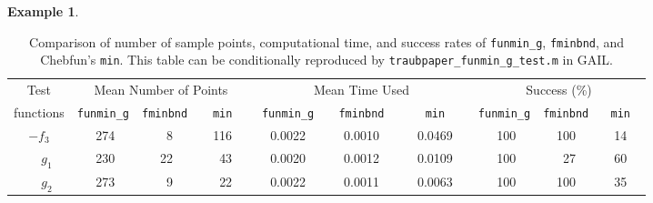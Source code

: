 \documentclass[review]{elsarticle}
\theoremstyle{definition}
\newtheorem{exmp}{Example}
\newcommand{\funming}{\texttt{funmin\_g}\xspace}
\newcommand{\fminbnd}{\texttt{fminbnd}\xspace}
\begin{document}
\begin{exmp}
%
\begin{table}[tb]
	\centering
	\caption{Comparison of number of sample points, computational time,  and success
		rates of \funming, \fminbnd, and
		Chebfun's \texttt{min}.
		This table can be conditionally reproduced by
		\texttt{traubpaper\_funmin\_g\_test.m} in GAIL.}
	\label{tab:funmingVsfminbndVsChebfun}
	{\footnotesize

	\setlength{\tabcolsep}{.3em}
		\begin{tabular}{ccrccrccrccrccrccrccrccrccrc}		
			Test      &    \multicolumn{9}{c}{Mean Number of Points}   & \multicolumn{9}{c}{Mean Time Used}  & \multicolumn{9}{c}{Success (\%)}
			\\  functions &  \multicolumn{3}{c}{\funming} &  \multicolumn{3}{c}{\fminbnd}  &  \multicolumn{3}{c}{\texttt{min}}
		  &  \multicolumn{3}{c}{\funming}  &  \multicolumn{3}{c}{\fminbnd }  &  \multicolumn{3}{c}{\texttt{min} }  &  \multicolumn{3}{c}{\funming} & \multicolumn{3}{c}{\fminbnd} & \multicolumn{3}{c}{\texttt{min}}
			\\ \toprule
			$-f_3$   &&  274   &&&   8   &&&  116     &&&   0.0022   &&&   0.0010    &&& 0.0469  &&&   100   &&&  100   &&&  14
			\\ $\phantom{-}g_1$   && 230 &&&  22   &&&    43    &&& 0.0020  &&&    0.0012   &&&  0.0109 &&&    100   &&&   27   &&&  60
			\\ $\phantom{-}g_2$   &&  273 &&&   9   &&&   22    &&&  0.0022   &&&   0.0011    &&&  0.0063 &&&    100   &&& 100   &&&  35
		\end{tabular}
				
}
\end{table}
\end{exmp}
\end{document}
